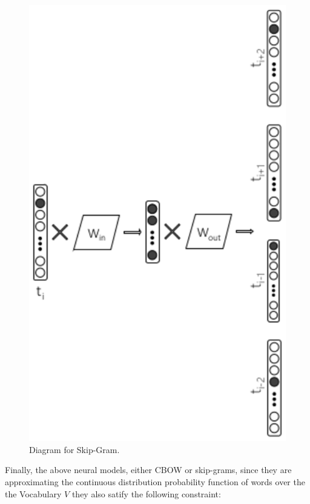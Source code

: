 \begin{figure}[t]
	\begin{center} 
    	\includegraphics[scale=0.99]{Figures/skip_gram.eps}
		\caption{Diagram for Skip-Gram.}
		\label{chap:word_embeddingss:fig:skipgram_diagram}
	\end{center}
\end{figure}

Finally, the above neural models, either CBOW or skip-grams, since they are approximating the continuous distribution probability function of words over the the Vocabulary $V$ they also satify the following constraint:

